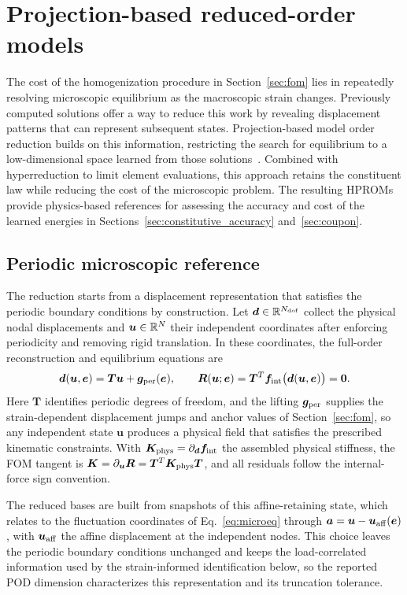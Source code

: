 \section{Projection-based reduced-order models}
\label{sec:reduced}
The cost of the homogenization procedure in Section~\ref{sec:fom} lies in repeatedly resolving microscopic equilibrium as the macroscopic strain changes. Previously computed solutions offer a way to reduce this work by revealing displacement patterns that can represent subsequent states. Projection-based model order reduction builds on this information, restricting the search for equilibrium to a low-dimensional space learned from those solutions~\cite{benner2015survey,yvonnet2007,Hernandez2014}. Combined with hyperreduction to limit element evaluations, this approach retains the constituent law while reducing the cost of the microscopic problem. The resulting HPROMs provide physics-based references for assessing the accuracy and cost of the learned energies in Sections~\ref{sec:constitutive_accuracy} and~\ref{sec:coupon}.

\subsection{Periodic microscopic reference}
The reduction starts from a displacement representation that satisfies the periodic boundary conditions by construction. Let $\bm d\in\mathbb R^{N_{\rm dof}}$ collect the physical nodal displacements and $\bm u\in\mathbb R^N$ their independent coordinates after enforcing periodicity and removing rigid translation. In these coordinates, the full-order reconstruction and equilibrium equations are
\begin{equation}
 \bm d(\bm u,\bm e)=\bm T\bm u+\bm g_{\rm per}(\bm e),
 \qquad \bm R(\bm u;\bm e)=\bm T^T\bm f_{\rm int}
                 \bigl(\bm d(\bm u,\bm e)\bigr)=\bm0.
 \label{eq:hdm_lifting}
\end{equation}
Here $\bm T$ identifies periodic degrees of freedom, and the lifting $\bm g_{\rm per}$ supplies the strain-dependent displacement jumps and anchor values of Section~\ref{sec:fom}, so any independent state $\bm u$ produces a physical field that satisfies the prescribed kinematic constraints. With $\bm K_{\rm phys}=\partial_{\bm d}\bm f_{\rm int}$ the assembled physical stiffness, the FOM tangent is $\bm K=\partial_{\bm u}\bm R=\bm T^T\bm K_{\rm phys}\bm T$, and all residuals follow the internal-force sign convention.

The reduced bases are built from snapshots of this affine-retaining state, which relates to the fluctuation coordinates of Eq.~\eqref{eq:microeq} through $\bm a=\bm u-\bm u_{\rm aff}(\bm e)$, with $\bm u_{\rm aff}$ the affine displacement at the independent nodes. This choice leaves the periodic boundary conditions unchanged and keeps the load-correlated information used by the strain-informed identification below, so the reported POD dimension characterizes this representation and its truncation tolerance.

